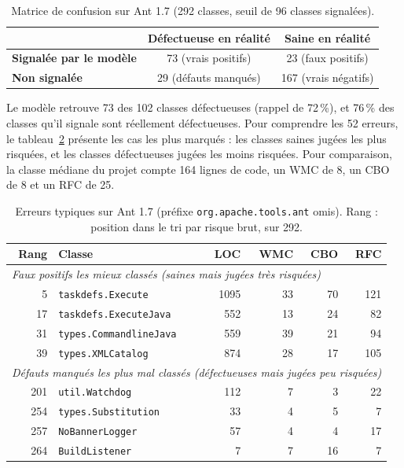 \documentclass[11pt,a4paper,openany]{report}
\newcommand{\code}[1]{\texttt{\small #1}}
\begin{document}
\begin{table}[H]
\centering\small
\caption{Matrice de confusion sur Ant 1.7 (292 classes, seuil de 96 classes signalées).}
\label{tab:confusion}
\begin{tabular}{lcc}
\toprule
 & \textbf{Défectueuse en réalité} & \textbf{Saine en réalité} \\
\midrule
\textbf{Signalée par le modèle} & 73 (vrais positifs) & 23 (faux positifs) \\
\textbf{Non signalée}           & 29 (défauts manqués) & 167 (vrais négatifs) \\
\bottomrule
\end{tabular}
\end{table}

Le modèle retrouve 73 des 102 classes défectueuses (rappel de 72\,\%), et 76\,\% des classes qu'il signale sont
réellement défectueuses. Pour comprendre les 52 erreurs, le tableau~\ref{tab:errors} présente les cas les plus
marqués : les classes saines jugées les plus risquées, et les classes défectueuses jugées les moins risquées.
Pour comparaison, la classe médiane du projet compte 164 lignes de code, un WMC de 8, un CBO de 8 et un RFC de 25.

\begin{table}[H]
\centering\small
\caption{Erreurs typiques sur Ant 1.7 (préfixe \code{org.apache.tools.ant} omis). Rang : position dans le tri par
risque brut, sur 292.}
\label{tab:errors}
\begin{tabular}{rlrrrr}
\toprule
\textbf{Rang} & \textbf{Classe} & \textbf{LOC} & \textbf{WMC} & \textbf{CBO} & \textbf{RFC} \\
\midrule
\multicolumn{6}{l}{\textit{Faux positifs les mieux classés (saines mais jugées très risquées)}} \\
5  & \code{taskdefs.Execute}         & 1095 & 33 & 70 & 121 \\
17 & \code{taskdefs.ExecuteJava}     & 552  & 13 & 24 & 82 \\
31 & \code{types.CommandlineJava}    & 559  & 39 & 21 & 94 \\
39 & \code{types.XMLCatalog}         & 874  & 28 & 17 & 105 \\
\midrule
\multicolumn{6}{l}{\textit{Défauts manqués les plus mal classés (défectueuses mais jugées peu risquées)}} \\
201 & \code{util.Watchdog}            & 112 & 7 & 3  & 22 \\
254 & \code{types.Substitution}       & 33  & 4 & 5  & 7 \\
257 & \code{NoBannerLogger}           & 57  & 4 & 4  & 17 \\
264 & \code{BuildListener}            & 7   & 7 & 16 & 7 \\
\bottomrule
\end{tabular}
\end{table}
\end{document}
